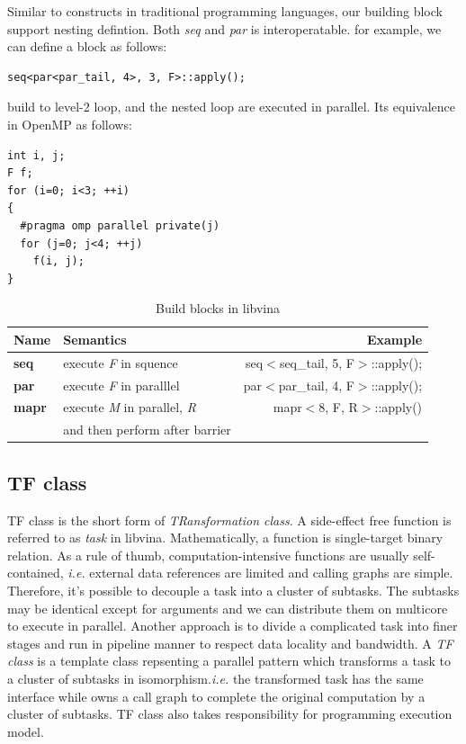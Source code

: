 Similar to constructs in traditional programming languages, our
building block support nesting defintion. Both \textit{seq} and
\textit{par} is interoperatable. for example, we can define a block as
follows:
\begin{verbatim}
seq<par<par_tail, 4>, 3, F>::apply();
\end{verbatim}
build to level-2 loop, and the nested loop are executed in
parallel. Its equivalence in OpenMP as follows:
\begin{verbatim}
int i, j;
F f;
for (i=0; i<3; ++i)
{
  #pragma omp parallel private(j)
  for (j=0; j<4; ++j) 
    f(i, j);
}
\end{verbatim}

\begin{table}[hbt]
\caption{Build blocks in libvina}
\begin{tabular}{|l|l|r|}
\hline
Name& Semantics& Example\\
\hline
\textbf{seq} & execute \textit{F} in squence & seq$<$seq\_tail, 5, F$>$::apply();\\
\hline
\textbf{par} & execute \textit{F} in paralllel & par$<$par\_tail, 4,
F$>$::apply();\\
\hline
\textbf{mapr}& execute \textit{M} in parallel, 
\textit{R}& mapr$<$8, F, R$>$::apply()\\
& and then perform after barrier&\\
\hline
\end{tabular}
\end{table}
\subsection{TF class}
TF class is the short form of \textit{TRansformation class}.  A
side-effect free function is referred to as
\emph{task} in libvina. Mathematically, a function is
single-target binary relation. As a rule of thumb,
computation-intensive functions are usually
self-contained, \textit{i.e.} external data references are limited and
calling graphs are simple. Therefore, it's possible to
decouple a task into a cluster of subtasks. The subtasks may be identical
except for arguments and we can distribute them on multicore to execute in
parallel.  Another approach is to divide a complicated task into finer stages
and run in pipeline manner to respect data locality and bandwidth. A
\textit{TF class} is a template class repsenting a parallel pattern which
transforms a task to a cluster of subtasks in
isomorphism.\textit{i.e.} the transformed task has the same interface
while owns a call graph to complete the original computation by a
cluster of subtasks. TF class also takes responsibility for
programming execution model.


